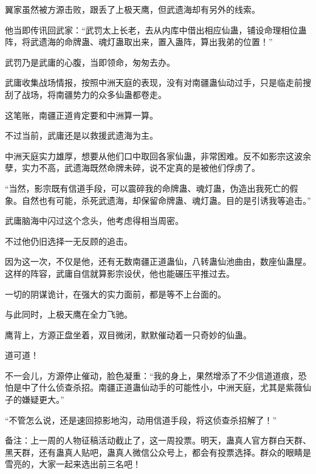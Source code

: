 \begin{this_body}
翼家虽然被方源击败，跟丢了上极天鹰，但武遗海却有另外的线索。

他当即传讯回武家：“武罚太上长老，去从内库中借出相应仙蛊，铺设命理相位蛊阵，将武遗海的命牌蛊、魂灯蛊取出来，置入蛊阵，算出我弟的位置！”

武罚乃是武庸的心腹，当即领命，匆匆去办。

武庸收集战场情报，按照中洲天庭的表现，没有对南疆蛊仙动过手，只是临走前搜刮了战场，将南疆势力的众多仙蛊都卷走。

这笔账，南疆正道肯定要和中洲算一算。

不过当前，武庸还是以救援武遗海为主。

中洲天庭实力雄厚，想要从他们口中取回各家仙蛊，非常困难。反不如影宗这波余孽，实力不高，武遗海既然命牌未碎，说不定真的是被他们俘虏了。

“当然，影宗既有信道手段，可以震碎我的命牌蛊、魂灯蛊，伪造出我死亡的假象。自然也有可能，杀死武遗海，却保留命牌蛊、魂灯蛊。目的是引诱我等追击。”

武庸脑海中闪过这个念头，他考虑得相当周密。

不过他仍旧选择一无反顾的追击。

因为这一次，不仅是他，还有无数南疆正道蛊仙，八转蛊仙池曲由，数座仙蛊屋。这样的阵容，武庸自信就算影宗设伏，他也能碾压平推过去。

一切的阴谋诡计，在强大的实力面前，都是等不上台面的。

与此同时，上极天鹰在全力飞驰。

鹰背上，方源正盘坐着，双目微闭，默默催动着一只奇妙的仙蛊。

道可道！

不一会儿，方源停止催动，脸色凝重：“我的身上，果然增添了不少信道道痕，恐怕是中了什么侦查杀招。南疆正道蛊仙动手的可能性小，中洲天庭，尤其是紫薇仙子的嫌疑更大。”

“不管怎么说，还是速回掠影地沟，动用信道手段，将这侦查杀招解了！”

备注：上一周的人物征稿活动截止了，这一周投票。明天，蛊真人官方群白天群、黑天群，还有蛊真人贴吧，蛊真人微信公众号上，都会有投票选择。群众的眼睛是雪亮的，大家一起来选出前三名吧！

\end{this_body}


